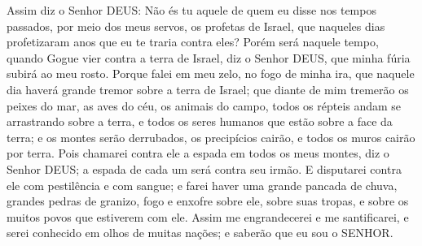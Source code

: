 {Assim diz o Senhor DEUS: Não és tu aquele de quem eu disse nos tempos passados, por meio dos meus servos, os profetas de Israel, que naqueles dias profetizaram
{} anos que eu te traria contra eles?
Porém será naquele tempo, quando Gogue vier contra a terra de Israel, diz o Senhor DEUS, que minha fúria subirá ao meu rosto.
Porque falei em meu zelo, no fogo de minha ira, que naquele dia haverá grande tremor sobre a terra de Israel;
 que diante de mim tremerão os peixes do mar, as aves do céu, os animais do campo, todos os répteis andam se arrastrando sobre a terra, e todos os seres humanos que estão sobre a face da terra; e os montes serão derrubados, os precipícios cairão, e todos os muros cairão por terra.
Pois chamarei contra ele a espada em todos os meus montes, diz o Senhor DEUS; a espada de cada um será contra seu irmão.
E disputarei contra ele com pestilência e com sangue; e farei haver uma grande pancada de chuva, grandes pedras de granizo, fogo e enxofre sobre ele, sobre suas tropas, e sobre os muitos povos que estiverem com ele.
Assim me engrandecerei e me santificarei, e serei conhecido em olhos de muitas nações; e saberão que eu sou o SENHOR.

}

